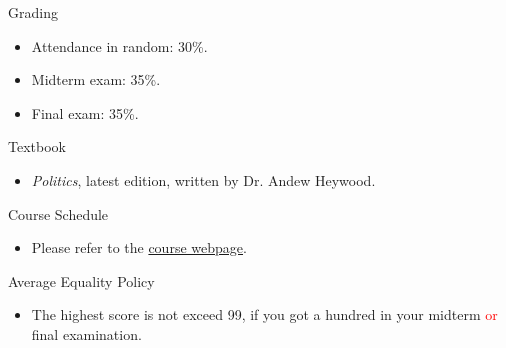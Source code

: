 \documentclass{article}
\begin{document}
\newpage
\begin{flushleft}
Grading \\
\end{flushleft}
\begin{itemize}
\item Attendance in random: 30\%. \\
\item Midterm exam: 35\%. \\
\item Final exam: 35\%. \\
\end{itemize}
Textbook \\
\begin{itemize}
\item \textit{Politics}, latest edition, written by Dr. Andew Heywood. \\
\end{itemize}
Course Schedule \\
\begin{itemize}
\item Please refer to the \href{https://politics-tchsiao.github.io/politics/}{course webpage}. \\
\end{itemize}
Average Equality Policy \\
\begin{itemize}
\item The highest score is not exceed 99, if you got a hundred in your midterm \textcolor{red}{or} final examination. \\
\end{itemize}
\end{document}
